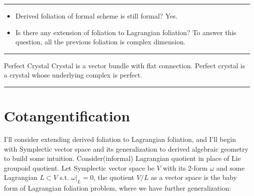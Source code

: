 \documentclass{article}
\begin{document}
\vspace{0.5cm}
\noindent\rule{\textwidth}{0.4pt}
\vspace{0.5cm}


\begin{question}{}{}
\begin{itemize}
\item Derived foliation of formal scheme is still formal? Yes.
\item Is there any extension of foliation to Lagrangian foliation?
To answer this question, all the previous foliation is complex dimension.
\end{itemize}
\end{question}



\vspace{0.5cm}
\noindent\rule{\textwidth}{0.4pt}
\vspace{0.5cm}



\begin{definition}{Perfect Crystal}{}
Crystal is a vector bundle with flat connection.
Perfect crystal is a crystal whose underlying complex is perfect.
\end{definition}


\vspace{0.5cm}
\noindent\rule{\textwidth}{0.4pt}
\vspace{0.5cm}








\section {Cotangentification}


\noindent
I'll consider extending derived foliation to Lagrangian foliation,
and I'll begin with Symplectic vector space and its generalization to derived algebraic geometry to build some intuition.
Consider(informal) Lagrangian quotient in place of Lie groupoid quotient.
Let Symplectic vector space be $V$ with its 2-form $\omega$ and some Lagrangian $L \subset V$ s.t. $\omega|_L=0$,
the quotient $V/L$ as a vector space is the baby form of Lagrangian foliation problem,
where we have further generalization: \\
\end{document}
